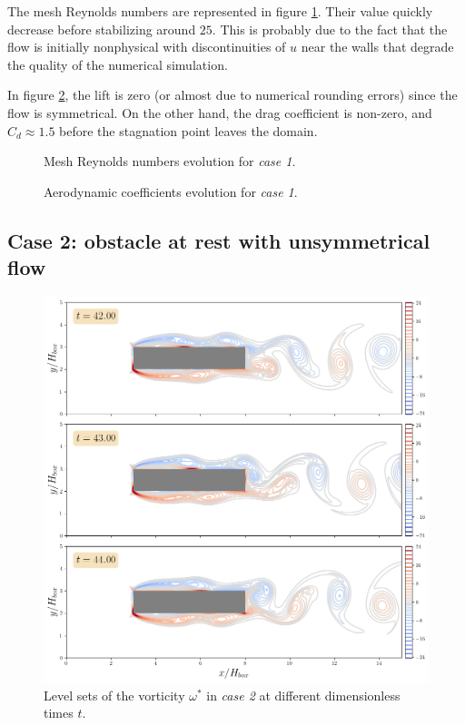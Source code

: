 \documentclass[11 pt]{article}
\begin{document}
The mesh Reynolds numbers are represented in figure \ref{fig:mesh_re_case1}. Their value quickly decrease before stabilizing around $25$. This is probably due to the fact that the flow is initially nonphysical with discontinuities of $u$ near the walls that degrade the quality of the numerical simulation.

In figure \ref{fig:drag_case1}, the lift is zero (or almost due to numerical rounding errors) since the flow is symmetrical. On the other hand, the drag coefficient is non-zero, and $C_d \approx 1.5$ before the stagnation point leaves the domain.

\begin{figure}[H]
    \centering
    
    \caption{Mesh Reynolds numbers evolution for \textit{case 1}.}
    \label{fig:mesh_re_case1}
\end{figure}


\begin{figure}[H]
    \centering
    
    \caption{Aerodynamic coefficients evolution for \textit{case 1}.}
    \label{fig:drag_case1}
\end{figure}




\subsection{Case 2: obstacle at rest with unsymmetrical flow}
\begin{figure}[H]
    \centering
    \includegraphics[width=\textwidth]{../figures/vorticity_case_2.png}
    \caption{Level sets of the vorticity $\omega^*$ in \textit{case 2} at different dimensionless times $t$.}
    \label{fig:vorticity_2}
\end{figure}
\end{document}
